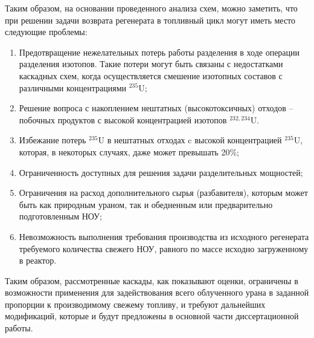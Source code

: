 Таким образом, на основании проведенного анализа схем, можно заметить, что при решении задачи возврата регенерата в топливный цикл могут иметь место следующие проблемы:
\begin{enumerate}
  \item Предотвращение нежелательных потерь работы разделения в ходе операции разделения изотопов. Такие потери могут быть связаны с недостатками каскадных схем, когда осуществляется смешение изотопных составов с различными концентрациями $^{235}$U; 
  \item Решение вопроса с накоплением нештатных (высокотоксичных) отходов -- побочных продуктов с высокой концентрацией изотопов $^{232,234}$U.
  \item Избежание потерь $^{235}$U  в нештатных отходах c высокой концентрацией $^{235}$U, которая, в некоторых случаях, даже может превышать 20\%;
  \item Ограниченность доступных для решения задачи разделительных мощностей;
  \item Ограничения на расход дополнительного сырья (разбавителя), которым может быть как природным ураном, так и обедненным или предварительно подготовленным НОУ;
  \item Невозможность выполнения требования производства из исходного регенерата требуемого количества свежего НОУ, равного по массе исходно загруженному в реактор.
\end{enumerate}

Таким образом, рассмотренные каскады, как показывают оценки, ограничены в возможности применения для задействования всего облученного урана в заданной пропорции к производимому свежему топливу, и требуют дальнейших модификаций, которые и будут предложены в основной части диссертационной работы. 
